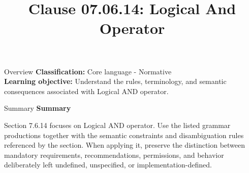 \documentclass[10pt,letterpaper]{article}
\title{Clause 07.06.14: Logical And Operator}
\author{}
\date{}
\begin{document}
\maketitle
\begin{CornellOverviewBox}{Overview}
\textbf{Classification:} Core language - Normative\\[2pt]
\textbf{Learning objective:} Understand the rules, terminology, and semantic consequences associated with Logical AND operator.
\end{CornellOverviewBox}\begin{CornellSummaryBox}{Summary}
{\sffamily\bfseries\color{Accent} Summary}\par\vspace{3pt}Section 7.6.14 focuses on Logical AND operator. Use the listed grammar productions together with the semantic constraints and disambiguation rules referenced by the section. When applying it, preserve the distinction between mandatory requirements, recommendations, permissions, and behavior deliberately left undefined, unspecified, or implementation-defined.
\end{CornellSummaryBox}
\end{document}
